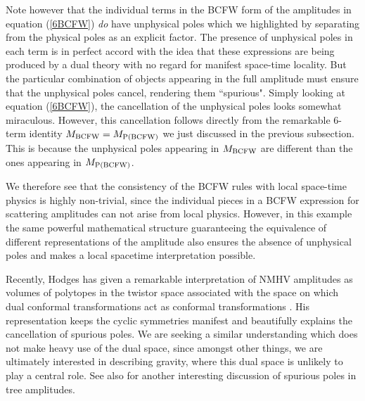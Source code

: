 \documentclass[12pt]{article}
\begin{document}
Note however that the individual terms in the BCFW form
of the amplitudes in equation (\ref{6BCFW}) {\it do} have unphysical
poles which we highlighted by separating from the physical poles as an explicit factor.
The presence of unphysical poles in each term is in perfect accord with the idea that these
expressions are being produced by a dual theory with no regard for
manifest space-time locality. But the particular combination of
objects appearing in the full amplitude must ensure that the
unphysical poles cancel, rendering them ``spurious". Simply looking
at equation (\ref{6BCFW}), the cancellation of the unphysical poles
looks somewhat miraculous. However, this cancellation follows
directly from the remarkable 6-term identity
$M_{{\rm BCFW}} = M_{{\rm P(BCFW)}}$ we just discussed in the previous subsection.
This is because the
unphysical poles appearing in $M_{\rm BCFW}$ are different than the ones
appearing in $M_{\rm P(BCFW)}$.

We therefore see that the consistency of the BCFW rules with local space-time physics is highly non-trivial,
since the individual pieces in a BCFW expression for scattering amplitudes can not arise
from local physics. However, in this example the same powerful mathematical
structure guaranteeing the equivalence of different
representations of the amplitude also ensures the absence of
unphysical poles and makes a local
spacetime interpretation possible. 

Recently, Hodges has given a remarkable
interpretation of NMHV amplitudes as volumes of polytopes in the twistor space associated with the space on which dual conformal transformations act as
conformal transformations \cite{Hodges:2009hk}. His representation
keeps the cyclic symmetries manifest and beautifully explains the cancellation
of spurious poles. We are seeking a similar understanding which does not
make heavy use of the dual space, since amongst other things, we are ultimately interested in
describing gravity, where this dual space is unlikely to play a central role. See also \cite{Korchemsky:2009hm} for another interesting discussion of spurious poles in tree amplitudes.
\end{document}
